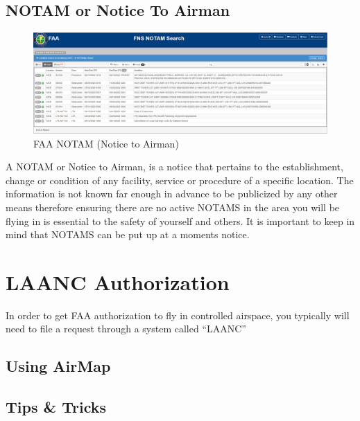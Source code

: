 \documentclass[
]{book}
\begin{document}
\hypertarget{notam-or-notice-to-airman}{%
\section{NOTAM or Notice To Airman}\label{notam-or-notice-to-airman}}

\begin{figure}
\centering
\includegraphics{images/FAA-Notam.png}
\caption{FAA NOTAM (Notice to Airman)}
\end{figure}

A NOTAM or Notice to Airman, is a notice that pertains to the establishment, change or condition of any facility, service or procedure of a specific location. The information is not known far enough in advance to be publicized by any other means therefore ensuring there are no active NOTAMS in the area you will be flying in is essential to the safety of yourself and others. It is important to keep in mind that NOTAMS can be put up at a moments notice.

\hypertarget{ch-LAANC}{%
\chapter{LAANC Authorization}\label{ch-LAANC}}

In order to get FAA authorization to fly in controlled airspace, you typically will need to file a request through a system called ``LAANC''

\hypertarget{using-airmap}{%
\section{Using AirMap}\label{using-airmap}}

\hypertarget{tips-tricks}{%
\section{Tips \& Tricks}\label{tips-tricks}}
\end{document}
